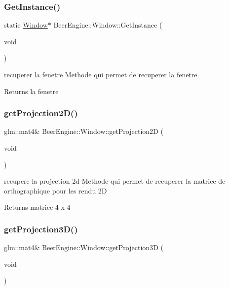 \subsubsection{\texorpdfstring{Get\+Instance()}{GetInstance()}}
{\footnotesize\ttfamily static \mbox{\hyperlink{class_beer_engine_1_1_window}{Window}}$\ast$ Beer\+Engine\+::\+Window\+::\+Get\+Instance (\begin{DoxyParamCaption}\item[{void}]{ }\end{DoxyParamCaption})\hspace{0.3cm}{\ttfamily [static]}}



recuperer la fenetre Methode qui permet de recuperer la fenetre. 

\begin{DoxyReturn}{Returns}
la fenetre 
\end{DoxyReturn}
\mbox{\label{class_beer_engine_1_1_window_a69da83af4143505f1e2c14649a854bd5}} 
\subsubsection{\texorpdfstring{get\+Projection2\+D()}{getProjection2D()}}
{\footnotesize\ttfamily glm\+::mat4\& Beer\+Engine\+::\+Window\+::get\+Projection2D (\begin{DoxyParamCaption}\item[{void}]{ }\end{DoxyParamCaption})}



recupere la projection 2d Methode qui permet de recuperer la matrice de orthographique pour les rendu 2D 

\begin{DoxyReturn}{Returns}
matrice 4 x 4 
\end{DoxyReturn}
\mbox{\label{class_beer_engine_1_1_window_a5f6872e397ddae51b61d0d140d3dca82}} 
\subsubsection{\texorpdfstring{get\+Projection3\+D()}{getProjection3D()}}
{\footnotesize\ttfamily glm\+::mat4\& Beer\+Engine\+::\+Window\+::get\+Projection3D (\begin{DoxyParamCaption}\item[{void}]{ }\end{DoxyParamCaption})}



